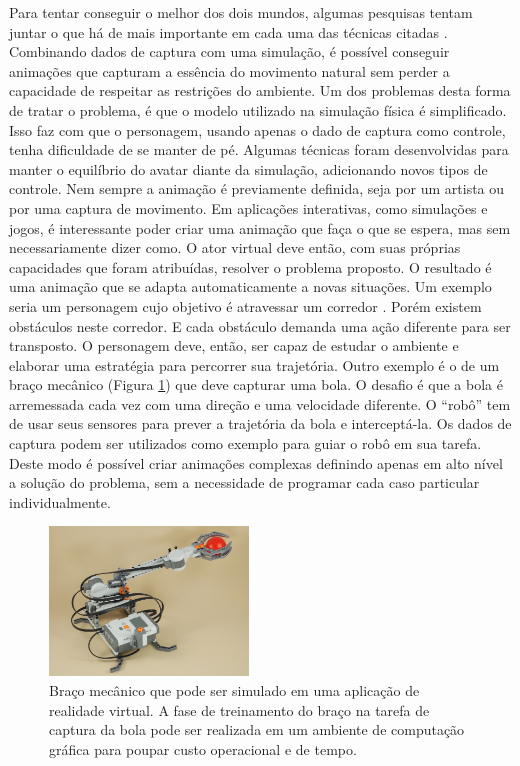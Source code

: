 \documentclass{article}
\begin{document}
Para tentar conseguir o melhor dos dois mundos, algumas pesquisas tentam juntar o que há de mais importante em cada uma das técnicas citadas \cite{bib:1999:Zordan}. Combinando dados de captura com uma simulação, é possível conseguir animações que capturam a essência do movimento natural sem perder a capacidade de respeitar as restrições do ambiente. \cite{bib:2002:Zordan} Um dos problemas desta forma de tratar o problema, é que o modelo utilizado na simulação física é simplificado. Isso faz com que o personagem, usando apenas o dado de captura como controle, tenha dificuldade de se manter de pé. Algumas técnicas foram desenvolvidas para manter o equilíbrio do avatar diante da simulação, adicionando novos tipos de controle. \cite{bib:2007:Yin} \cite{bib:2012:Geijtenbeek} \cite{bib:2014:Silva}
Nem sempre a animação é previamente definida, seja por um artista ou por uma captura de movimento. Em aplicações interativas, como simulações e jogos, é interessante poder criar uma animação que faça o que se espera, mas sem necessariamente dizer como. O ator virtual deve então, com suas próprias capacidades que foram atribuídas, resolver o problema proposto. O resultado é uma animação que se adapta automaticamente a novas situações. Um exemplo seria um personagem cujo objetivo é atravessar um corredor \cite{bib:2011:Renault}. Porém existem obstáculos neste corredor. E cada obstáculo demanda uma ação diferente para ser transposto. O personagem deve, então, ser capaz de estudar o ambiente e elaborar uma estratégia para percorrer sua trajetória. Outro exemplo é o de um braço mecânico (Figura \ref{fig:roboarm}) que deve capturar uma bola. O desafio é que a bola é arremessada cada vez com uma direção e uma velocidade diferente. O “robô” tem de usar seus sensores para prever a trajetória da bola e interceptá-la. Os dados de captura podem ser utilizados como exemplo para guiar o robô em sua tarefa. Deste modo é possível criar animações complexas definindo apenas em alto nível a solução do problema, sem a necessidade de programar cada caso particular individualmente.

\begin{figure}[ht]
  \centering
  \includegraphics[height=150px]{images/roboarm.jpg}
  \caption{Braço mecânico que pode ser simulado em uma aplicação de realidade virtual. A fase de treinamento do braço na tarefa de captura da bola pode ser realizada em um ambiente de computação gráfica para poupar custo operacional e de tempo.}
  \label{fig:roboarm}
\end{figure}
\end{document}

